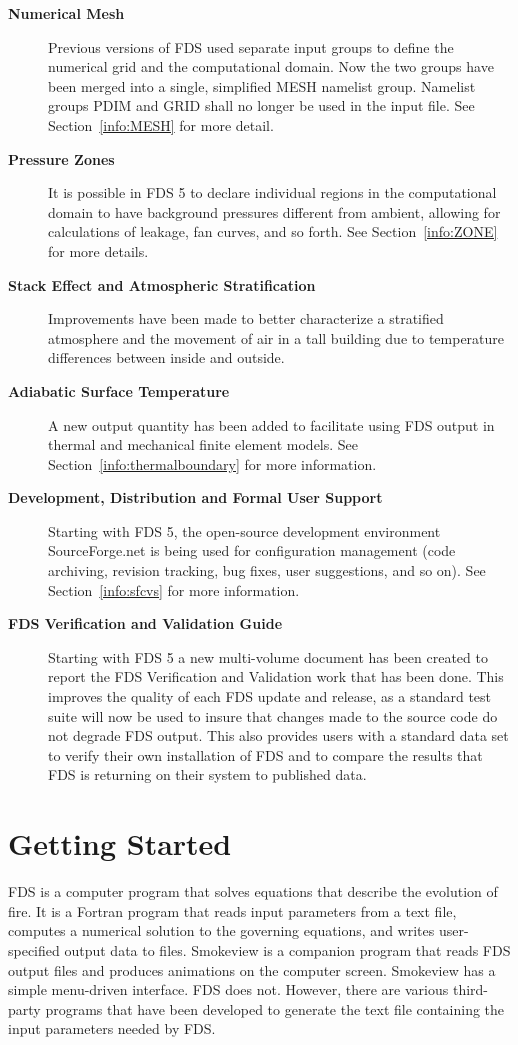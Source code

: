 \documentclass[11pt]{book}
\begin{document}
\begin{description}
\item[{\bf Numerical Mesh}] Previous versions of FDS used separate input groups
to define the numerical grid and the computational domain.  Now the two groups
have been merged into a single, simplified {\ct MESH} namelist group. Namelist groups {\ct PDIM} and
{\ct GRID} shall no longer be used in the input file.  See Section~\ref{info:MESH} for more detail.

\item[{\bf Pressure Zones}] It is possible in FDS 5 to declare individual
regions in the computational domain to have background pressures different from ambient,
allowing for calculations of leakage, fan curves, and so forth. See Section~\ref{info:ZONE} for more details.

\item[{\bf Stack Effect and Atmospheric Stratification}] Improvements have been made to
better characterize a stratified atmosphere and the movement of air in a tall building due
to temperature differences between inside and outside.

\item[{\bf Adiabatic Surface Temperature}] A new output quantity has been added to
facilitate using FDS output in thermal and mechanical finite element models.
See Section~\ref{info:thermalboundary} for more information.

\item[{\bf Development, Distribution and Formal User Support}] Starting with FDS 5, the open-source
development environment SourceForge.net is being used for configuration management
(code archiving, revision tracking, bug fixes, user suggestions, and so on).
See Section~\ref{info:sfcvs} for more information.

\item[{\bf FDS Verification and Validation Guide}] Starting with FDS 5 a new multi-volume document has
been created to report the FDS Verification and Validation work that has been done.  This improves the
quality of each FDS update and release, as a standard test suite will now be used to insure that changes
made to the source code do not degrade FDS output.  This also provides users with a standard
data set to verify their own installation of FDS and to compare the results that FDS is returning
on their system to published data.
\end{description}


\chapter{Getting Started}
\label{info:gettingstarted}
FDS is a computer program that solves equations that describe the evolution of fire.
It is a Fortran program that reads input parameters from a text file, computes
a numerical solution to the governing equations, and writes user-specified output data to files.
Smokeview is a companion program that reads FDS output files and produces animations on the computer screen.
Smokeview has a simple menu-driven interface. FDS does not. However, there are various third-party programs
that have been developed to generate the text file containing the input parameters needed by FDS.
\end{document}
